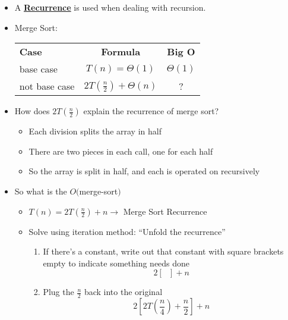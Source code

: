 \documentclass[12pt]{article}
\newcommand{\definition}[1]{\underline{\textbf{#1}}}
\begin{document}
\begin{itemize}

    \item A \definition{Recurrence} is used when dealing with recursion. 
    
    \item Merge Sort: \\
    
    \begin{tabular}{l c c}
        \textbf{Case} & \textbf{Formula} & \textbf{Big O} \\
        base case & $T(n) = \Theta(1)$ & $\Theta(1)$ \\
        not base case & $2T(\frac{n}{2}) + \Theta(n)$ & ? 
    \end{tabular}

    \item How does $2T(\frac{n}{2})$ explain the recurrence of merge sort?
    \begin{itemize}
        \item Each division splits the array in half
        \item There are two pieces in each call, one for each half
        \item So the array is split in half, and each is operated on recursively
    \end{itemize}

    \item So what is the $O($merge-sort$)$ 
    \begin{itemize}

        \item $T(n) = 2T(\frac{n}{2}) + n \rightarrow$ Merge Sort Recurrence
        \item Solve using iteration method: ``Unfold the recurrence''
        \begin{enumerate}

            \item If there's a constant, write out that constant with square brackets empty to indicate something needs done
            \begin{equation}
                2[\ \ \ ] + n
            \end{equation}

            \item Plug the $\frac{n}{2}$ back into the original
            \begin{equation}
                2[ 2T(\frac{n}{4}) + \frac{n}{2} ] + n
            \end{equation}


\end{enumerate}
\end{itemize}
\end{itemize}
\end{document}

